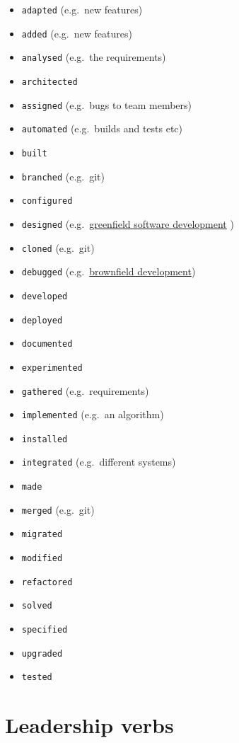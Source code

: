 \documentclass[
]{book}
\providecommand{\tightlist}{%
  \setlength{\itemsep}{0pt}\setlength{\parskip}{0pt}}
\begin{document}
\begin{itemize}
\tightlist
\item
  \texttt{adapted} (e.g.~new features)
\item
  \texttt{added} (e.g.~new features)
\item
  \texttt{analysed} (e.g.~the requirements)
\item
  \texttt{architected}
\item
  \texttt{assigned} (e.g.~bugs to team members)
\item
  \texttt{automated} (e.g.~builds and tests etc)
\item
  \texttt{built}
\item
  \texttt{branched} (e.g.~git)
\item
  \texttt{configured}
\item
  \texttt{designed} (e.g.~\href{https://en.wikipedia.org/wiki/Greenfield_project}{greenfield software development} )
\item
  \texttt{cloned} (e.g.~git)
\item
  \texttt{debugged} (e.g.~\href{https://en.wikipedia.org/wiki/Brownfield_(software_development)}{brownfield development})
\item
  \texttt{developed}
\item
  \texttt{deployed}
\item
  \texttt{documented}
\item
  \texttt{experimented}
\item
  \texttt{gathered} (e.g.~requirements)
\item
  \texttt{implemented} (e.g.~an algorithm)
\item
  \texttt{installed}
\item
  \texttt{integrated} (e.g.~different systems)
\item
  \texttt{made}
\item
  \texttt{merged} (e.g.~git)
\item
  \texttt{migrated}
\item
  \texttt{modified}
\item
  \texttt{refactored}
\item
  \texttt{solved}
\item
  \texttt{specified}
\item
  \texttt{upgraded}
\item
  \texttt{tested}
\end{itemize}

\hypertarget{leading}{%
\section{Leadership verbs}\label{leading}}
\end{document}
